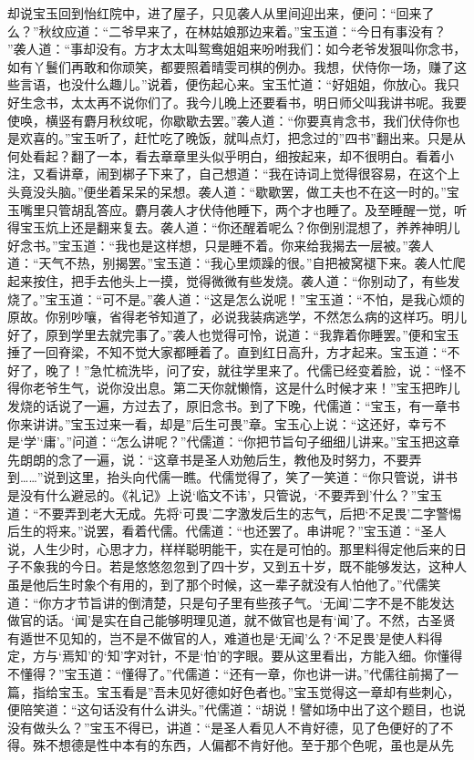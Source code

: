 \begin{parag}
    却说宝玉回到怡红院中，进了屋子，只见袭人从里间迎出来，便问：“回来了么？”秋纹应道：“二爷早来了，在林姑娘那边来着。”宝玉道：“今日有事没有？ ”袭人道：“事却没有。方才太太叫鸳鸯姐姐来吩咐我们：如今老爷发狠叫你念书，如有丫鬟们再敢和你顽笑，都要照着晴雯司棋的例办。我想，伏侍你一场，赚了这些言语，也没什么趣儿。”说着，便伤起心来。宝玉忙道：“好姐姐，你放心。我只好生念书，太太再不说你们了。我今儿晚上还要看书，明日师父叫我讲书呢。我要使唤，横竖有麝月秋纹呢，你歇歇去罢。”袭人道：“你要真肯念书，我们伏侍你也是欢喜的。”宝玉听了，赶忙吃了晚饭，就叫点灯，把念过的”四书”翻出来。只是从何处看起？翻了一本，看去章章里头似乎明白，细按起来，却不很明白。看着小注，又看讲章，闹到梆子下来了，自己想道：“我在诗词上觉得很容易，在这个上头竟没头脑。”便坐着呆呆的呆想。袭人道：“歇歇罢，做工夫也不在这一时的。”宝玉嘴里只管胡乱答应。麝月袭人才伏侍他睡下，两个才也睡了。及至睡醒一觉，听得宝玉炕上还是翻来复去。袭人道：“你还醒着呢么？你倒别混想了，养养神明儿好念书。”宝玉道：“我也是这样想，只是睡不着。你来给我揭去一层被。”袭人道：“天气不热，别揭罢。”宝玉道：“我心里烦躁的很。”自把被窝褪下来。袭人忙爬起来按住，把手去他头上一摸，觉得微微有些发烧。袭人道：“你别动了，有些发烧了。”宝玉道：“可不是。”袭人道：“这是怎么说呢！”宝玉道：“不怕，是我心烦的原故。你别吵嚷，省得老爷知道了，必说我装病逃学，不然怎么病的这样巧。明儿好了，原到学里去就完事了。”袭人也觉得可怜，说道：“我靠着你睡罢。”便和宝玉捶了一回脊梁，不知不觉大家都睡着了。直到红日高升，方才起来。宝玉道：“不好了，晚了！”急忙梳洗毕，问了安，就往学里来了。代儒已经变着脸，说：“怪不得你老爷生气，说你没出息。第二天你就懒惰，这是什么时候才来！”宝玉把昨儿发烧的话说了一遍，方过去了，原旧念书。到了下晚，代儒道：“宝玉，有一章书你来讲讲。”宝玉过来一看，却是”后生可畏”章。宝玉心上说：“这还好，幸亏不是‘学’‘庸’。”问道：“怎么讲呢？”代儒道：“你把节旨句子细细儿讲来。”宝玉把这章先朗朗的念了一遍，说：“这章书是圣人劝勉后生，教他及时努力，不要弄到……”说到这里，抬头向代儒一瞧。代儒觉得了，笑了一笑道：“你只管说，讲书是没有什么避忌的。《礼记》上说‘临文不讳’，只管说，‘不要弄到’什么？”宝玉道：“不要弄到老大无成。先将‘可畏’二字激发后生的志气，后把‘不足畏’二字警惕后生的将来。”说罢，看着代儒。代儒道：“也还罢了。串讲呢？”宝玉道：“圣人说，人生少时，心思才力，样样聪明能干，实在是可怕的。那里料得定他后来的日子不象我的今日。若是悠悠忽忽到了四十岁，又到五十岁，既不能够发达，这种人虽是他后生时象个有用的，到了那个时候，这一辈子就没有人怕他了。”代儒笑道：“你方才节旨讲的倒清楚，只是句子里有些孩子气。‘无闻’二字不是不能发达做官的话。‘闻’是实在自己能够明理见道，就不做官也是有‘闻’了。不然，古圣贤有遁世不见知的，岂不是不做官的人，难道也是‘无闻’么？‘不足畏’是使人料得定，方与‘焉知’的‘知’字对针，不是‘怕’的字眼。要从这里看出，方能入细。你懂得不懂得？”宝玉道：“懂得了。”代儒道：“还有一章，你也讲一讲。”代儒往前揭了一篇，指给宝玉。宝玉看是”吾未见好德如好色者也。”宝玉觉得这一章却有些刺心，便陪笑道：“这句话没有什么讲头。”代儒道：“胡说！譬如场中出了这个题目，也说没有做头么？”宝玉不得已，讲道：“是圣人看见人不肯好德，见了色便好的了不得。殊不想德是性中本有的东西，人偏都不肯好他。至于那个色呢，虽也是从先
\end{parag}

